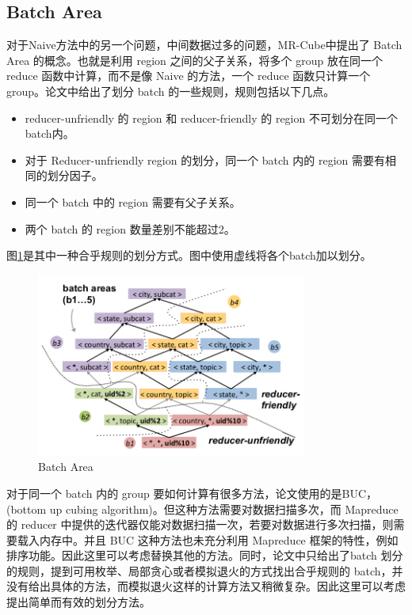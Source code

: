 \subsection{Batch Area}

对于Naive方法中的另一个问题，中间数据过多的问题，MR-Cube中提出了 Batch Area 的概念。也就是利用 region 之间的父子关系，将多个 group 放在同一个 reduce 函数中计算，而不是像 Naive 的方法，一个 reduce 函数只计算一个 group。论文中给出了划分 batch 的一些规则，规则包括以下几点。
\begin{itemize}\setlength{\itemsep}{0pt}
\item reducer-unfriendly 的 region 和 reducer-friendly 的 region 不可划分在同一个batch内。
\item 对于 Reducer-unfriendly region 的划分，同一个 batch 内的 region 需要有相同的划分因子。
\item 同一个 batch 中的 region 需要有父子关系。
\item 两个 batch 的 region 数量差别不能超过2。
\end{itemize}

图\ref{batch_area}是其中一种合乎规则的划分方式。图中使用虚线将各个batch加以划分。

\begin{figure}[!ht] 
\centering\includegraphics[width=3.5in]{picture/ch_datacube_mr/batch_area} 
\caption{Batch Area}\label{batch_area} 
\end{figure}

对于同一个 batch 内的 group 要如何计算有很多方法，论文使用的是BUC，(bottom up cubing algorithm)。但这种方法需要对数据扫描多次，而 Mapreduce 的 reducer 中提供的迭代器仅能对数据扫描一次，若要对数据进行多次扫描，则需要载入内存中。并且 BUC 这种方法也未充分利用 Mapreduce 框架的特性，例如排序功能。因此这里可以考虑替换其他的方法。同时，论文中只给出了batch 划分的规则，提到可用枚举、局部贪心或者模拟退火的方式找出合乎规则的 batch，并没有给出具体的方法，而模拟退火这样的计算方法又稍微复杂。因此这里可以考虑提出简单而有效的划分方法。


